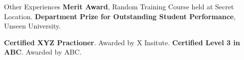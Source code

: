\begin{rubric}{Other Experiences}
\entry*[2002] \textbf{Merit Award}, Random Training Course held at Secret Location.
%
\entry*[2001] \textbf{Department Prize for Outstanding Student Performance}, Unseen University.

\entry*[2014] \textbf{Certified XYZ Practioner}. Awarded by X Insitute.
\entry*[2006] \textbf{Certified Level 3 in ABC}. Awarded by ABC.

\end{rubric}